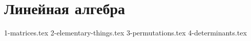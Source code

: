 \section{Линейная алгебра}
{1-matrices.tex}
{2-elementary-things.tex}
{3-permutations.tex}
{4-determinants.tex}
